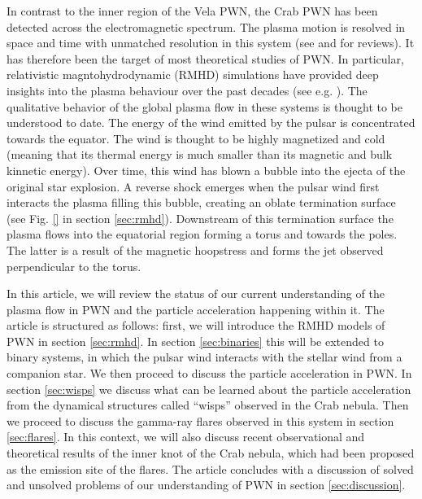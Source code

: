 In contrast to the inner region of the Vela PWN, the Crab PWN has been detected across the electromagnetic spectrum. The plasma motion is resolved in space and time with unmatched resolution in this system (see \citet{Hester_2008} and \citet{BuehlerBlandford2013a} for reviews). It has therefore been the target of most theoretical studies of PWN. In particular, relativistic magntohydrodynamic (RMHD) simulations have provided deep insights into the plasma behaviour over the past decades (see e.g.  \citet{Komissarov_2004,Del_Zanna_2006,Porth_2013}). The qualitative behavior of the global plasma flow in these systems is thought to be understood to date. The energy of the wind emitted by the pulsar is concentrated towards the equator. The wind is thought to be highly magnetized and cold (meaning that its thermal energy is much smaller than its magnetic and bulk kinnetic energy). Over time, this wind has blown a bubble into the ejecta of the original star explosion. A reverse shock emerges when the pulsar wind first interacts the plasma filling this bubble, creating an oblate termination surface (see Fig. \ref{} in section \ref{sec:rmhd}). Downstream of this termination surface the plasma flows into the equatorial region forming a torus and towards the poles. The latter is a result of the magnetic hoopstress and forms the jet observed perpendicular to the torus.

In this article, we will review the status of our current understanding of the plasma flow in PWN and the particle acceleration happening within it.  The article is structured as follows: first, we will introduce the RMHD models of PWN in section \ref{sec:rmhd}. In section \ref{sec:binaries} this will be extended to binary systems, in which the pulsar wind interacts with the stellar wind from a companion star. We then proceed to discuss the particle acceleration in PWN. In section \ref{sec:wisps} we discuss what can be learned about the particle acceleration from the dynamical structures called ``wisps'' observed in the Crab nebula. Then we proceed to discuss the gamma-ray flares observed in this system in section \ref{sec:flares}. In this context, we will also discuss recent observational and theoretical results of the inner knot of the Crab nebula, which had been proposed as the emission site of the flares. The article concludes with a discussion of solved and unsolved problems of our understanding of PWN in section \ref{sec:discussion}.